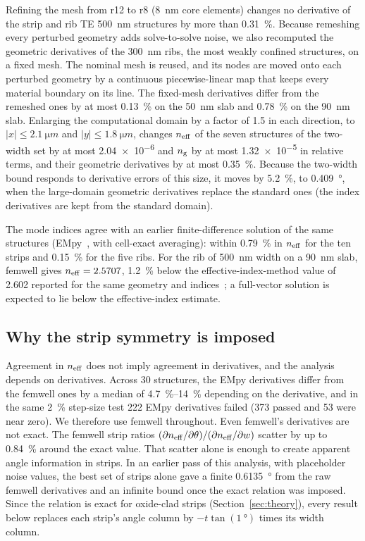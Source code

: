 Refining the mesh from r12 to r8 (\qty{8}{nm} core elements) changes no derivative of the strip and rib TE
\qty{500}{nm} structures by more than \qty{0.31}{\percent}. Because remeshing every perturbed geometry adds solve-to-solve
noise, we also recomputed the geometric derivatives of the \qty{300}{nm} ribs, the most weakly confined structures,
on a fixed mesh. The nominal mesh is reused, and its nodes are moved onto each perturbed geometry by a continuous
piecewise-linear map that keeps every material boundary on its line. The fixed-mesh derivatives differ from the
remeshed ones by at most \qty{0.13}{\percent} on the \qty{50}{nm} slab and \qty{0.78}{\percent} on the \qty{90}{nm}
slab. Enlarging the computational domain by a factor of 1.5 in each direction, to
$|x|\le\qty{2.1}{\micro m}$ and $|y|\le\qty{1.8}{\micro m}$, changes $n_\mathrm{eff}$ of the seven structures of the two-width set by
at most \num{2.04e-6} and $n_\mathrm{g}$ by at most \num{1.32e-5} in relative terms, and their geometric derivatives by at most
\qty{0.35}{\percent}. Because the two-width bound responds to derivative errors of this size, it moves by
\qty{5.2}{\percent}, to \qty{0.409}{\degree}, when the large-domain geometric derivatives replace the standard ones (the
index derivatives are kept from the standard domain).

The mode indices agree with an earlier finite-difference solution of the same structures (EMpy~\cite{empy}, with
cell-exact averaging): within \qty{0.79}{\percent} in $n_\mathrm{eff}$ for the ten strips and \qty{0.15}{\percent} for the five ribs.
For the rib of \qty{500}{nm} width on a \qty{90}{nm} slab, femwell gives $n_\mathrm{eff}=2.5707$, \qty{1.2}{\percent} below the
effective-index-method value of 2.602 reported for the same geometry and indices~\cite{jiao2025}; a full-vector solution
is expected to lie below the effective-index estimate.

\subsection{Why the strip symmetry is imposed}

Agreement in $n_\mathrm{eff}$ does not imply agreement in derivatives, and the analysis depends on derivatives. Across 30
structures, the EMpy derivatives differ from the femwell ones by a median of \qtyrange{4.7}{14}{\percent} depending on the
derivative, and in the same \qty{2}{\percent} step-size test 222 EMpy derivatives failed (373 passed and 53 were near
zero). We therefore use
femwell throughout. Even femwell's derivatives are not exact. The femwell strip ratios
$(\partial n_\mathrm{eff}/\partial\theta)/(\partial n_\mathrm{eff}/\partial w)$ scatter by up to \qty{0.84}{\percent} around the exact
value. That scatter alone is enough to create apparent angle information in strips. In an earlier pass of this
analysis, with placeholder noise values, the best set of strips alone gave a finite \qty{0.6135}{\degree} from the raw
femwell derivatives and an infinite bound once the exact relation was imposed. Since the relation is exact for oxide-clad
strips (Section~\ref{sec:theory}), every result below replaces each strip's angle column by $-t\tan(\qty{1}{\degree})$
times its width column.

